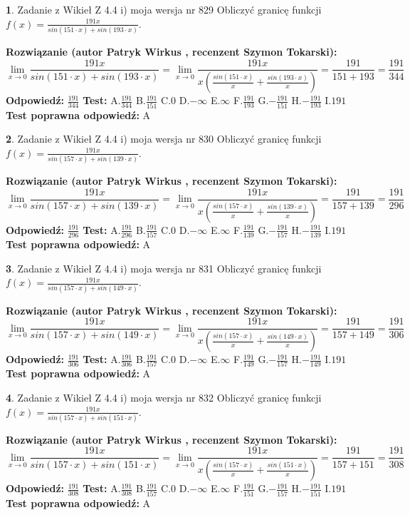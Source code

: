 \documentclass[12pt, a4paper]{article}
\theoremstyle{definition} %
\newtheorem{zad}{}
\newcommand{\zadStart}[1]{\begin{zad}#1\newline}
\newcommand{\zadStop}{\end{zad}}
\newcommand{\rozwStart}[2]{\noindent \textbf{Rozwiązanie (autor #1 , recenzent #2): }\newline}
\newcommand{\rozwStop}{\newline}
\newcommand{\odpStart}{\noindent \textbf{Odpowiedź:}\newline}
\newcommand{\odpStop}{\newline}
\newcommand{\testStart}{\noindent \textbf{Test:}\newline}
\newcommand{\testStop}{\newline}
\newcommand{\kluczStart}{\noindent \textbf{Test poprawna odpowiedź:}\newline}
\newcommand{\kluczStop}{\newline}
\begin{document}
\zadStart{Zadanie z Wikieł Z 4.4 i) moja wersja nr 829}
Obliczyć granicę funkcji $f(x)=\frac{191x}{sin(151\cdot x) +sin(193\cdot x)}$.
\zadStop
\rozwStart{Patryk Wirkus}{Szymon Tokarski}
$$\lim\limits_{x\to 0}\frac{191x}{sin(151\cdot x) +sin(193\cdot x)}=\lim\limits_{x\to 0}\frac{191x}{x(\frac{sin(151\cdot x)}{x}+\frac{sin(193\cdot x)}{x})}=\frac{191}{151+193} = \frac{191}{344}$$
\rozwStop
\odpStart
$\frac{191}{344}$
\odpStop
\testStart
A.$\frac{191}{344}$
B.$\frac{191}{151}$
C.$0$
D.$-\infty$
E.$\infty$
F.$\frac{191}{193}$
G.$-\frac{191}{151}$
H.$-\frac{191}{193}$
I.$191$
\testStop
\kluczStart
A
\kluczStop



\zadStart{Zadanie z Wikieł Z 4.4 i) moja wersja nr 830}
Obliczyć granicę funkcji $f(x)=\frac{191x}{sin(157\cdot x) +sin(139\cdot x)}$.
\zadStop
\rozwStart{Patryk Wirkus}{Szymon Tokarski}
$$\lim\limits_{x\to 0}\frac{191x}{sin(157\cdot x) +sin(139\cdot x)}=\lim\limits_{x\to 0}\frac{191x}{x(\frac{sin(157\cdot x)}{x}+\frac{sin(139\cdot x)}{x})}=\frac{191}{157+139} = \frac{191}{296}$$
\rozwStop
\odpStart
$\frac{191}{296}$
\odpStop
\testStart
A.$\frac{191}{296}$
B.$\frac{191}{157}$
C.$0$
D.$-\infty$
E.$\infty$
F.$\frac{191}{139}$
G.$-\frac{191}{157}$
H.$-\frac{191}{139}$
I.$191$
\testStop
\kluczStart
A
\kluczStop



\zadStart{Zadanie z Wikieł Z 4.4 i) moja wersja nr 831}
Obliczyć granicę funkcji $f(x)=\frac{191x}{sin(157\cdot x) +sin(149\cdot x)}$.
\zadStop
\rozwStart{Patryk Wirkus}{Szymon Tokarski}
$$\lim\limits_{x\to 0}\frac{191x}{sin(157\cdot x) +sin(149\cdot x)}=\lim\limits_{x\to 0}\frac{191x}{x(\frac{sin(157\cdot x)}{x}+\frac{sin(149\cdot x)}{x})}=\frac{191}{157+149} = \frac{191}{306}$$
\rozwStop
\odpStart
$\frac{191}{306}$
\odpStop
\testStart
A.$\frac{191}{306}$
B.$\frac{191}{157}$
C.$0$
D.$-\infty$
E.$\infty$
F.$\frac{191}{149}$
G.$-\frac{191}{157}$
H.$-\frac{191}{149}$
I.$191$
\testStop
\kluczStart
A
\kluczStop



\zadStart{Zadanie z Wikieł Z 4.4 i) moja wersja nr 832}
Obliczyć granicę funkcji $f(x)=\frac{191x}{sin(157\cdot x) +sin(151\cdot x)}$.
\zadStop
\rozwStart{Patryk Wirkus}{Szymon Tokarski}
$$\lim\limits_{x\to 0}\frac{191x}{sin(157\cdot x) +sin(151\cdot x)}=\lim\limits_{x\to 0}\frac{191x}{x(\frac{sin(157\cdot x)}{x}+\frac{sin(151\cdot x)}{x})}=\frac{191}{157+151} = \frac{191}{308}$$
\rozwStop
\odpStart
$\frac{191}{308}$
\odpStop
\testStart
A.$\frac{191}{308}$
B.$\frac{191}{157}$
C.$0$
D.$-\infty$
E.$\infty$
F.$\frac{191}{151}$
G.$-\frac{191}{157}$
H.$-\frac{191}{151}$
I.$191$
\testStop
\kluczStart
A
\kluczStop
\end{document}
